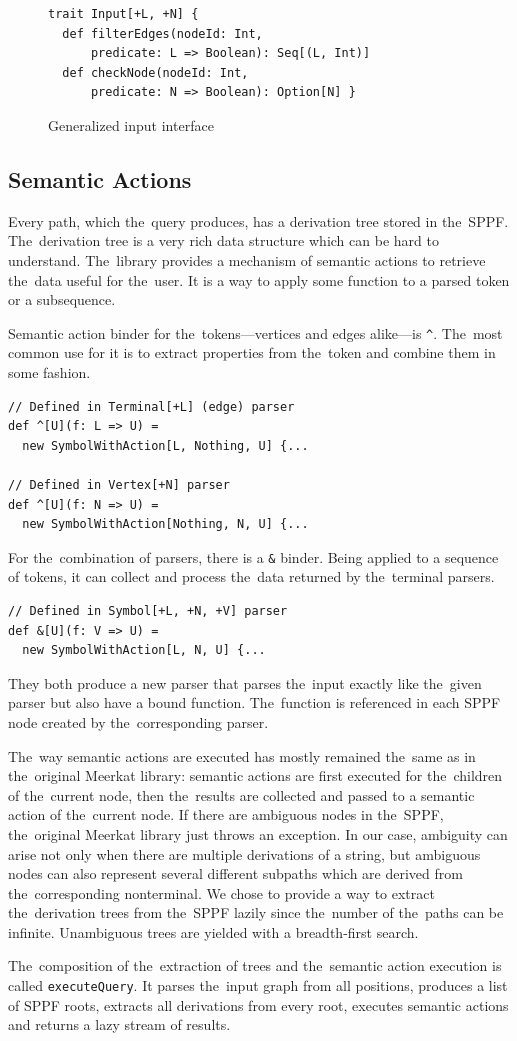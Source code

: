 \begin{figure}[t]
\begin{lstlisting}
trait Input[+L, +N] {
  def filterEdges(nodeId: Int,
      predicate: L => Boolean): Seq[(L, Int)]
  def checkNode(nodeId: Int,
      predicate: N => Boolean): Option[N] }
\end{lstlisting}
\caption{Generalized input interface}
\label{fig:input}
\end{figure}

\subsection{Semantic Actions}
\label{sec:semanticActions}

Every path, which the~query produces, has a derivation tree stored in the~SPPF.
The~derivation tree is a very rich data structure which can be hard to understand.
The~library provides a mechanism of semantic actions to retrieve the~data useful for the~user.
It is a way to apply some function to a parsed token or a subsequence.

Semantic action binder for the~tokens---vertices and edges alike---is \lstinline{^}. The~most common use for it is to extract properties from the~token and combine them in some fashion.

\begin{lstlisting}
// Defined in Terminal[+L] (edge) parser
def ^[U](f: L => U) =
  new SymbolWithAction[L, Nothing, U] {...

// Defined in Vertex[+N] parser
def ^[U](f: N => U) =
  new SymbolWithAction[Nothing, N, U] {...
\end{lstlisting}

For the~combination of parsers, there is a \lstinline{&} binder. Being  applied to a sequence of tokens, it can collect and process the~data returned by the~terminal parsers.

\begin{lstlisting}
// Defined in Symbol[+L, +N, +V] parser
def &[U](f: V => U) =
  new SymbolWithAction[L, N, U] {...
\end{lstlisting}

They both produce a new parser that parses the~input exactly like the~given parser but also have a bound function.
The~function is referenced in each SPPF node created by the~corresponding parser.

The~way semantic actions are executed has mostly remained the~same as in the~original Meerkat library: semantic actions are first executed for the~children of the~current node, then the~results are collected and passed to a semantic action of the~current node.
If there are ambiguous nodes in the~SPPF, the~original Meerkat library just throws an exception.
In our case, ambiguity can arise not only when there are multiple derivations of a string, but ambiguous nodes can also represent several different subpaths which are derived from the~corresponding nonterminal.
We chose to provide a way to extract the~derivation trees from the~SPPF lazily since the~number of the~paths can be infinite.
Unambiguous trees are yielded with a breadth-first search.

The~composition of the~extraction of trees and the~semantic action execution is called \lstinline{executeQuery}.
It parses the~input graph from all positions, produces a list of SPPF roots, extracts all derivations from every root, executes semantic actions and returns a lazy stream of results.